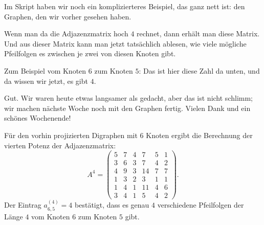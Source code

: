 \begin{spoken-clean}[01:19:44 - 01:25:38]
Im Skript haben wir noch ein komplizierteres Beispiel, das ganz nett ist: den Graphen, den wir vorher gesehen haben.

Wenn man da die Adjazenzmatrix hoch $4$ rechnet, dann erhält man diese Matrix. Und aus dieser Matrix kann man jetzt tatsächlich ablesen, wie viele mögliche Pfeilfolgen es zwischen je zwei von diesen Knoten gibt.

Zum Beispiel vom Knoten $6$ zum Knoten $5$: Das ist hier diese Zahl da unten, und da wissen wir jetzt, es gibt $4$.

Gut. Wir waren heute etwas langsamer als gedacht, aber das ist nicht schlimm; wir machen nächste Woche noch mit den Graphen fertig. Vielen Dank und ein schönes Wochenende! 
\end{spoken-clean}

\begin{math-stroke}
\begin{meta-note}
Für den vorhin projizierten Digraphen mit $6$ Knoten ergibt die Berechnung der vierten Potenz der Adjazenzmatrix:
\[
A^4 = \begin{pmatrix}
5 & 7 & 4 & 7 & 5 & 1 \\
3 & 6 & 3 & 7 & 4 & 2 \\
4 & 9 & 3 & 14 & 7 & 7 \\
1 & 3 & 2 & 3 & 1 & 1 \\
1 & 4 & 1 & 11 & 4 & 6 \\
3 & 4 & 1 & 5 & 4 & 2
\end{pmatrix}.
\]
Der Eintrag $a_{6,5}^{(4)} = 4$ bestätigt, dass es genau $4$ verschiedene Pfeilfolgen der Länge $4$ vom Knoten $6$ zum Knoten $5$ gibt.
\end{meta-note}
\end{math-stroke}

